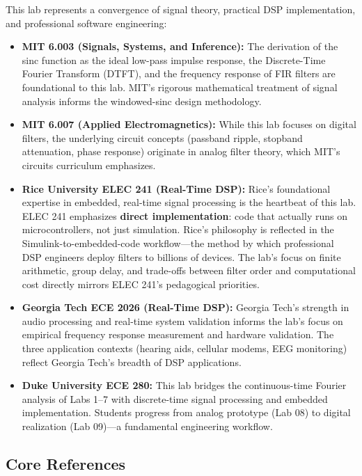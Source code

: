 \documentclass[11pt,letterpaper]{article}
\begin{document}
This lab represents a convergence of signal theory, practical DSP implementation, and professional software engineering:

\begin{itemize}
    \item \textbf{MIT 6.003 (Signals, Systems, and Inference):} The derivation of the sinc function as the ideal low-pass impulse response, the Discrete-Time Fourier Transform (DTFT), and the frequency response of FIR filters are foundational to this lab. MIT's rigorous mathematical treatment of signal analysis informs the windowed-sinc design methodology.

    \item \textbf{MIT 6.007 (Applied Electromagnetics):} While this lab focuses on digital filters, the underlying circuit concepts (passband ripple, stopband attenuation, phase response) originate in analog filter theory, which MIT's circuits curriculum emphasizes.

    \item \textbf{Rice University ELEC 241 (Real-Time DSP):} Rice's foundational expertise in embedded, real-time signal processing is the heartbeat of this lab. ELEC 241 emphasizes \textbf{direct implementation}: code that actually runs on microcontrollers, not just simulation. Rice's philosophy is reflected in the Simulink-to-embedded-code workflow—the method by which professional DSP engineers deploy filters to billions of devices. The lab's focus on finite arithmetic, group delay, and trade-offs between filter order and computational cost directly mirrors ELEC 241's pedagogical priorities.

    \item \textbf{Georgia Tech ECE 2026 (Real-Time DSP):} Georgia Tech's strength in audio processing and real-time system validation informs the lab's focus on empirical frequency response measurement and hardware validation. The three application contexts (hearing aids, cellular modems, EEG monitoring) reflect Georgia Tech's breadth of DSP applications.

    \item \textbf{Duke University ECE 280:} This lab bridges the continuous-time Fourier analysis of Labs 1--7 with discrete-time signal processing and embedded implementation. Students progress from analog prototype (Lab 08) to digital realization (Lab 09)—a fundamental engineering workflow.
\end{itemize}

\subsection*{Core References}
\end{document}
